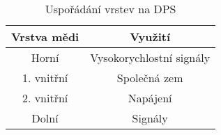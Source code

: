 \begin{table}[h!]
\centering

\begin{tabular}{|c|c|}
\hline 
Vrstva mědi & Využití \\ 
\hline 
\hline 
Horní & Vysokorychlostní signály \\ 
\hline 
1. vnitřní & Společná zem \\ 
\hline 
2. vnitřní & Napájení \\ 
\hline 
Dolní & Signály \\ 
\hline 
\end{tabular} 

\caption{Uspořádání vrstev na DPS} 
\label{table:signalStackup}
\end{table} 